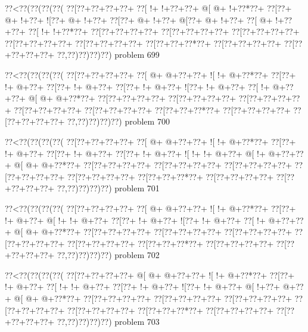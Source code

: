\vbox{\vbox{\goo
\0??<\0??(\0??(\0??(\0??(
\0??[\0??+\0??+\0??+\0??+
\0??[\- !+\- !+\0??+\0??+
\- @[\- @+\- !+\0??*\0??+
\0??[\0??+\- @+\- !+\0??+
\- ![\0??+\- @+\- !+\0??+
\0??[\0??+\- @+\- !+\0??+
\- @[\0??+\- @+\- !+\0??+
\0??[\- @+\- !+\0??+\0??+
\0??[\- !+\- !+\0??*\0??+
\0??[\0??+\0??+\0??+\0??+
\0??[\0??+\0??+\0??+\0??+
\0??[\0??+\0??+\0??+\0??+
\0??[\0??+\0??+\0??+\0??+
\0??[\0??+\0??+\0??+\0??+
\0??[\0??+\0??+\0??*\0??+
\0??[\0??+\0??+\0??+\0??+
\0??[\0??+\0??+\0??+\0??+
\0??,\0??)\0??)\0??)\0??)
}
\hfil problem 699\hfil\break
}

\vbox{\vbox{\goo
\0??<\0??(\0??(\0??(\0??(
\0??[\0??+\0??+\0??+\0??+
\0??[\- @+\- @+\0??+\0??+
\- ![\- !+\- @+\0??*\0??+
\0??[\0??+\- !+\- @+\0??+
\0??[\0??+\- !+\- @+\0??+
\0??[\0??+\- !+\- @+\0??+
\- ![\0??+\- !+\- @+\0??+
\0??[\- !+\- @+\0??+\0??+
\- @[\- @+\- @+\0??*\0??+
\0??[\0??+\0??+\0??+\0??+
\0??[\0??+\0??+\0??+\0??+
\0??[\0??+\0??+\0??+\0??+
\0??[\0??+\0??+\0??+\0??+
\0??[\0??+\0??+\0??+\0??+
\0??[\0??+\0??+\0??*\0??+
\0??[\0??+\0??+\0??+\0??+
\0??[\0??+\0??+\0??+\0??+
\0??,\0??)\0??)\0??)\0??)
}
\hfil problem 700\hfil\break
}

\vbox{\vbox{\goo
\0??<\0??(\0??(\0??(\0??(
\0??[\0??+\0??+\0??+\0??+
\0??[\- @+\- @+\0??+\0??+
\- ![\- !+\- @+\0??*\0??+
\0??[\0??+\- !+\- @+\0??+
\0??[\0??+\- !+\- @+\0??+
\0??[\0??+\- !+\- @+\0??+
\- ![\- !+\- !+\- @+\0??+
\- @[\- !+\- @+\0??+\0??+
\- @[\- @+\- @+\0??*\0??+
\0??[\0??+\0??+\0??+\0??+
\0??[\0??+\0??+\0??+\0??+
\0??[\0??+\0??+\0??+\0??+
\0??[\0??+\0??+\0??+\0??+
\0??[\0??+\0??+\0??+\0??+
\0??[\0??+\0??+\0??*\0??+
\0??[\0??+\0??+\0??+\0??+
\0??[\0??+\0??+\0??+\0??+
\0??,\0??)\0??)\0??)\0??)
}
\hfil problem 701\hfil\break
}

\vbox{\vbox{\goo
\0??<\0??(\0??(\0??(\0??(
\0??[\0??+\0??+\0??+\0??+
\0??[\- @+\- @+\0??+\0??+
\- ![\- !+\- @+\0??*\0??+
\0??[\0??+\- !+\- @+\0??+
\- @[\- !+\- !+\- @+\0??+
\0??[\0??+\- !+\- @+\0??+
\- ![\0??+\- !+\- @+\0??+
\0??[\- !+\- @+\0??+\0??+
\- @[\- @+\- @+\0??*\0??+
\0??[\0??+\0??+\0??+\0??+
\0??[\0??+\0??+\0??+\0??+
\0??[\0??+\0??+\0??+\0??+
\0??[\0??+\0??+\0??+\0??+
\0??[\0??+\0??+\0??+\0??+
\0??[\0??+\0??+\0??*\0??+
\0??[\0??+\0??+\0??+\0??+
\0??[\0??+\0??+\0??+\0??+
\0??,\0??)\0??)\0??)\0??)
}
\hfil problem 702\hfil\break
}

\vbox{\vbox{\goo
\0??<\0??(\0??(\0??(\0??(
\0??[\0??+\0??+\0??+\0??+
\- @[\- @+\- @+\0??+\0??+
\- ![\- !+\- @+\0??*\0??+
\0??[\0??+\- !+\- @+\0??+
\0??[\- !+\- !+\- @+\0??+
\0??[\0??+\- !+\- @+\0??+
\- ![\0??+\- !+\- @+\0??+
\- @[\- !+\0??+\- @+\0??+
\- @[\- @+\- @+\0??*\0??+
\0??[\0??+\0??+\0??+\0??+
\0??[\0??+\0??+\0??+\0??+
\0??[\0??+\0??+\0??+\0??+
\0??[\0??+\0??+\0??+\0??+
\0??[\0??+\0??+\0??+\0??+
\0??[\0??+\0??+\0??*\0??+
\0??[\0??+\0??+\0??+\0??+
\0??[\0??+\0??+\0??+\0??+
\0??,\0??)\0??)\0??)\0??)
}
\hfil problem 703\hfil\break
}

